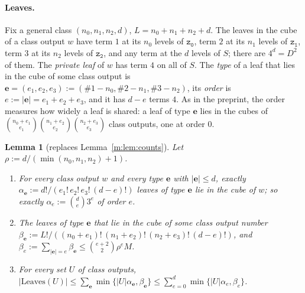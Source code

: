 \documentclass[11pt]{article}
\newtheorem{lemma}[theorem]{Lemma}
\theoremstyle{definition}
\theoremstyle{remark}
\newcommand{\Leaves}{\mathrm{Leaves}}
\newcommand{\tl}[1]{\mathtt{#1}}
\begin{document}
\paragraph{Leaves.} Fix a general class $(n_0,n_1,n_2,d)$, $L=n_0+n_1+n_2+d$. The leaves in the cube of a class output $w$ have term $1$ at its $n_0$ levels of $\tl{z_0}$, term $2$ at its $n_1$ levels of $\tl{z_1}$, term $3$ at its $n_2$ levels of $\tl{z_2}$, and any term at the $d$ levels of $S$; there are $4^d=D^2$ of them. The \emph{private leaf} of $w$ has term $4$ on all of $S$. The \emph{type} of a leaf that lies in the cube of some class output is $\mathbf e=(e_1,e_2,e_3):=(\#1-n_0,\#2-n_1,\#3-n_2)$, its \emph{order} is $e:=|\mathbf e|=e_1+e_2+e_3$, and it has $d-e$ terms $4$. As in the preprint, the order measures how widely a leaf is shared: a leaf of type $\mathbf e$ lies in the cubes of $\binom{n_0+e_1}{e_1}\binom{n_1+e_2}{e_2}\binom{n_2+e_3}{e_3}$ class outputs, one at order $0$.

\begin{lemma}[replaces Lemma~\ref{m:lem:counts}]\label{t:lem:counts}
Let $\rho:=d/(\min(n_0,n_1,n_2)+1)$.
\begin{enumerate}[label=(\alph*),nosep]
\item For every class output $w$ and every type $\mathbf e$ with $|\mathbf e|\le d$, exactly $\alpha_{\mathbf e}:=d!/(e_1!\,e_2!\,e_3!\,(d-e)!)$ leaves of type $\mathbf e$ lie in the cube of $w$; so exactly $\alpha_e:=\binom de3^e$ of order $e$.
\item The leaves of type $\mathbf e$ that lie in the cube of some class output number $\beta_{\mathbf e}:=L!/((n_0+e_1)!\,(n_1+e_2)!\,(n_2+e_3)!\,(d-e)!)$, and $\beta_e:=\sum_{|\mathbf e|=e}\beta_{\mathbf e}\le\binom{e+2}2\rho^eM$.
\item For every set $U$ of class outputs, $|\Leaves(U)|\le\sum_{\mathbf e}\min\{|U|\alpha_{\mathbf e},\beta_{\mathbf e}\}\le\sum_{e=0}^d\min\{|U|\alpha_e,\beta_e\}$.
\end{enumerate}
\end{lemma}
\end{document}
